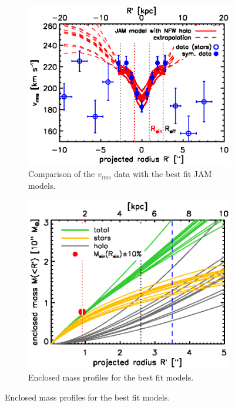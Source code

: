 \documentclass[useAMS,usenatbib]{mnras}
\begin{document}

\begin{figure}
\centering
\begin{subfigure}{.48\textwidth}
  \centering
  \includegraphics[width=0.9\linewidth]{fig/B4_rms_error_curves.ps}
  \caption{Comparison of the $v_\text{rms}$ data with the best fit JAM models.}
  \label{fig:modelB4_vrms}
\end{subfigure}%
\hspace{.02\textwidth}
\begin{subfigure}{.48\textwidth}
  \centering
  \includegraphics[width=0.9\linewidth]{fig/B4_jam_profiles_errors_short_projmass.ps}
  \caption{Enclosed mass profiles for the best fit models.}

\end{subfigure}
\end{figure}
\end{document}
